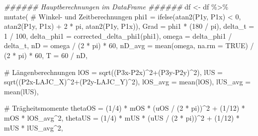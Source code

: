 \documentclass[
  letterpaper,
  DIV=11]{scrartcl}
\newenvironment{Shaded}{\begin{snugshade}}{\end{snugshade}}
\newcommand{\AttributeTok}[1]{\textcolor[rgb]{0.40,0.45,0.13}{#1}}
\newcommand{\CommentTok}[1]{\textcolor[rgb]{0.37,0.37,0.37}{#1}}
\newcommand{\ConstantTok}[1]{\textcolor[rgb]{0.56,0.35,0.01}{#1}}
\newcommand{\DecValTok}[1]{\textcolor[rgb]{0.68,0.00,0.00}{#1}}
\newcommand{\DocumentationTok}[1]{\textcolor[rgb]{0.37,0.37,0.37}{\textit{#1}}}
\newcommand{\FunctionTok}[1]{\textcolor[rgb]{0.28,0.35,0.67}{#1}}
\newcommand{\NormalTok}[1]{\textcolor[rgb]{0.00,0.23,0.31}{#1}}
\newcommand{\OtherTok}[1]{\textcolor[rgb]{0.00,0.23,0.31}{#1}}
\newcommand{\SpecialCharTok}[1]{\textcolor[rgb]{0.37,0.37,0.37}{#1}}
\begin{document}
\begin{Shaded}
\begin{Highlighting}[]
\DocumentationTok{\#\#\#\#\#\# Hauptberechnungen im DataFrame \#\#\#\#\#\#}
\NormalTok{df }\OtherTok{\textless{}{-}}\NormalTok{ df }\SpecialCharTok{\%\textgreater{}\%}
  \FunctionTok{mutate}\NormalTok{(}
    \CommentTok{\# Winkel{-} und Zeitberechnungen}
    \AttributeTok{phi1 =} \FunctionTok{ifelse}\NormalTok{(}\FunctionTok{atan2}\NormalTok{(P1y, P1x) }\SpecialCharTok{\textless{}} \DecValTok{0}\NormalTok{, }\FunctionTok{atan2}\NormalTok{(P1y, P1x) }\SpecialCharTok{+} \DecValTok{2} \SpecialCharTok{*}\NormalTok{ pi, }\FunctionTok{atan2}\NormalTok{(P1y, P1x)),}
    \AttributeTok{Grad =}\NormalTok{ phi1 }\SpecialCharTok{*}\NormalTok{ (}\DecValTok{180} \SpecialCharTok{/}\NormalTok{ pi),}
    \AttributeTok{delta\_t =} \DecValTok{1} \SpecialCharTok{/} \DecValTok{100}\NormalTok{,}
    \AttributeTok{delta\_phi1 =} \FunctionTok{corrected\_delta\_phi1}\NormalTok{(phi1),}
    \AttributeTok{omega =}\NormalTok{ delta\_phi1 }\SpecialCharTok{/}\NormalTok{ delta\_t,}
    \AttributeTok{nD =}\NormalTok{ omega }\SpecialCharTok{/}\NormalTok{ (}\DecValTok{2} \SpecialCharTok{*}\NormalTok{ pi) }\SpecialCharTok{*} \DecValTok{60}\NormalTok{,}
    \AttributeTok{nD\_avg =} \FunctionTok{mean}\NormalTok{(omega, }\AttributeTok{na.rm =} \ConstantTok{TRUE}\NormalTok{) }\SpecialCharTok{/}\NormalTok{ (}\DecValTok{2} \SpecialCharTok{*}\NormalTok{ pi) }\SpecialCharTok{*} \DecValTok{60}\NormalTok{,}
    \AttributeTok{T =} \DecValTok{60} \SpecialCharTok{/}\NormalTok{ nD,}
    
    \CommentTok{\# Längenberechnungen}
    \AttributeTok{lOS =} \FunctionTok{sqrt}\NormalTok{((P3x}\SpecialCharTok{{-}}\NormalTok{P2x)}\SpecialCharTok{\^{}}\DecValTok{2}\SpecialCharTok{+}\NormalTok{(P3y}\SpecialCharTok{{-}}\NormalTok{P2y)}\SpecialCharTok{\^{}}\DecValTok{2}\NormalTok{),}
    \AttributeTok{lUS =} \FunctionTok{sqrt}\NormalTok{((P2x}\SpecialCharTok{{-}}\NormalTok{LAJC\_X)}\SpecialCharTok{\^{}}\DecValTok{2}\SpecialCharTok{+}\NormalTok{(P2y}\SpecialCharTok{{-}}\NormalTok{LAJC\_Y)}\SpecialCharTok{\^{}}\DecValTok{2}\NormalTok{),}
    \AttributeTok{lOS\_avg =} \FunctionTok{mean}\NormalTok{(lOS),}
    \AttributeTok{lUS\_avg =} \FunctionTok{mean}\NormalTok{(lUS),}
    
    \CommentTok{\# Trägheitsmomente}
    \AttributeTok{thetaOS =}\NormalTok{ (}\DecValTok{1}\SpecialCharTok{/}\DecValTok{4}\NormalTok{) }\SpecialCharTok{*}\NormalTok{ mOS }\SpecialCharTok{*}\NormalTok{ (uOS }\SpecialCharTok{/}\NormalTok{ (}\DecValTok{2} \SpecialCharTok{*}\NormalTok{ pi))}\SpecialCharTok{\^{}}\DecValTok{2} \SpecialCharTok{+}\NormalTok{ (}\DecValTok{1}\SpecialCharTok{/}\DecValTok{12}\NormalTok{) }\SpecialCharTok{*}\NormalTok{ mOS }\SpecialCharTok{*}\NormalTok{ lOS\_avg}\SpecialCharTok{\^{}}\DecValTok{2}\NormalTok{,}
    \AttributeTok{thetaUS =}\NormalTok{ (}\DecValTok{1}\SpecialCharTok{/}\DecValTok{4}\NormalTok{) }\SpecialCharTok{*}\NormalTok{ mUS }\SpecialCharTok{*}\NormalTok{ (uUS }\SpecialCharTok{/}\NormalTok{ (}\DecValTok{2} \SpecialCharTok{*}\NormalTok{ pi))}\SpecialCharTok{\^{}}\DecValTok{2} \SpecialCharTok{+}\NormalTok{ (}\DecValTok{1}\SpecialCharTok{/}\DecValTok{12}\NormalTok{) }\SpecialCharTok{*}\NormalTok{ mUS }\SpecialCharTok{*}\NormalTok{ lUS\_avg}\SpecialCharTok{\^{}}\DecValTok{2}\NormalTok{,}
    

\end{Highlighting}
\end{Shaded}
\end{document}
